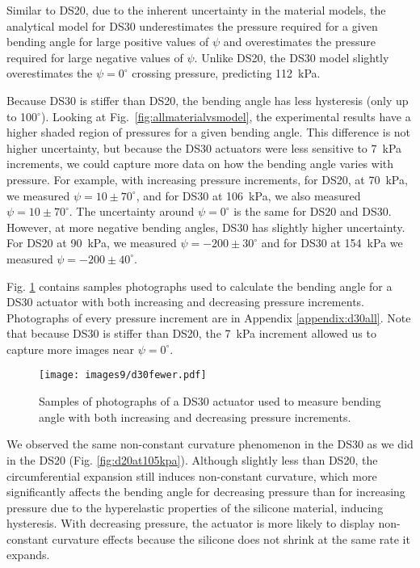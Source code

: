 Similar to DS20, due to the inherent uncertainty in the material models, the analytical model for DS30 underestimates the pressure required for a given bending angle for large positive values of $\psi$ and overestimates the pressure required for large negative values of $\psi$. Unlike DS20, the DS30 model slightly overestimates the $\psi=0^\circ$ crossing pressure, predicting 112~kPa. 

Because DS30 is stiffer than DS20, the bending angle has less hysteresis (only up to 100$^\circ$). Looking at Fig.~\ref{fig:allmaterialvsmodel}, the experimental results have a higher shaded region of pressures for a given bending angle. This difference is not higher uncertainty, but because the DS30 actuators were less sensitive to 7~kPa increments, we could capture more data on how the bending angle varies with pressure. For example, with increasing pressure increments, for DS20, at 70~kPa, we measured $\psi=10\pm70^\circ$, and for DS30 at 106~kPa, we also measured $\psi=10\pm70^\circ$. The uncertainty around $\psi=0^\circ$ is the same for DS20 and DS30. However, at more negative bending angles, DS30 has slightly higher uncertainty. For DS20 at 90~kPa, we measured $\psi=-200\pm30^\circ$ and for DS30 at 154~kPa we measured $\psi=-200\pm40^\circ$. 

\clearpage
Fig. \ref{fig:d30fewer} contains samples photographs used to calculate the bending angle for a DS30 actuator with both increasing and decreasing pressure increments. Photographs of every pressure increment are in Appendix \ref{appendix:d30all}. Note that because DS30 is stiffer than DS20, the 7~kPa increment allowed us to capture more images near $\psi=0^\circ$. 

\begin{figure}[!ht]
    \centering
     \texttt{[image: images9/d30fewer.pdf]}
    \caption{Samples of photographs of a DS30 actuator used to measure bending angle with both increasing and decreasing pressure increments.}
    \label{fig:d30fewer}
\end{figure}

We observed the same non-constant curvature phenomenon in the DS30 as we did in the DS20 (Fig. \ref{fig:d20at105kpa}). Although slightly less than DS20, the circumferential expansion still induces non-constant curvature, which more significantly affects the bending angle for decreasing pressure than for increasing pressure due to the hyperelastic properties of the silicone material, inducing hysteresis. With decreasing pressure, the actuator is more likely to display non-constant curvature effects because the silicone does not shrink at the same rate it expands. 

